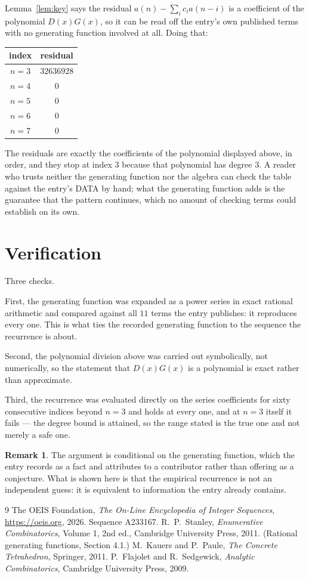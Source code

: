 \documentclass[11pt,a4paper]{article}
\theoremstyle{plain}
\theoremstyle{definition}
\newtheorem{remark}[theorem]{Remark}
\begin{document}
Lemma~\ref{lem:key} says the residual $a(n)-\sum_ic_ia(n-i)$ is a coefficient of the
polynomial $D(x)G(x)$, so it can be read off the entry's own published terms with no
generating function involved at all. Doing that:
\begin{center}
\begin{tabular}{cc}
index & residual \\ \hline
$n=3$ & $32636928$ \\
$n=4$ & $0$ \\
$n=5$ & $0$ \\
$n=6$ & $0$ \\
$n=7$ & $0$
\end{tabular}
\end{center}
The residuals are exactly the coefficients of the polynomial displayed above, in order, and
they stop at index $3$ because that polynomial has degree $3$. A reader who trusts
neither the generating function nor the algebra can check the table against the entry's DATA
by hand; what the generating function adds is the guarantee that the pattern continues, which
no amount of checking terms could establish on its own.

\section{Verification}

Three checks.

First, the generating function was expanded as a power series in exact rational arithmetic and
compared against all $11$ terms the entry publishes: it reproduces every one. This is
what ties the recorded generating function to the sequence the recurrence is about.

Second, the polynomial division above was carried out symbolically, not numerically, so the
statement that $D(x)G(x)$ is a polynomial is exact rather than approximate.

Third, the recurrence was evaluated directly on the series coefficients for sixty consecutive
indices beyond $n=3$ and holds at every one, and at $n=3$ itself it fails --- the
degree bound is attained, so the range stated is the true one and not merely a safe one.

\begin{remark}
The argument is conditional on the generating function, which the entry records as a fact and
attributes to a contributor rather than offering as a conjecture. What is shown here is that
the empirical recurrence is not an independent guess: it is equivalent to information the
entry already contains.
\end{remark}

\begin{thebibliography}{9}
 The OEIS Foundation, \emph{The On-Line Encyclopedia of Integer
Sequences}, \url{https://oeis.org}, 2026. Sequence A233167.
 R.~P.~Stanley, \emph{Enumerative Combinatorics}, Volume 1, 2nd ed.,
Cambridge University Press, 2011. (Rational generating functions, Section 4.1.)
 M.~Kauers and P.~Paule, \emph{The Concrete Tetrahedron}, Springer, 2011.
 P.~Flajolet and R.~Sedgewick, \emph{Analytic Combinatorics}, Cambridge
University Press, 2009.
\end{thebibliography}
\end{document}
